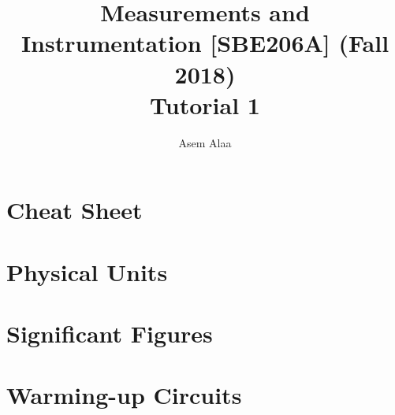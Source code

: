 \documentclass[a4paper,11pt]{book}
\begin{document}
\author{Asem Alaa}

\title{Measurements and Instrumentation [SBE206A] (Fall 2018)\\ Tutorial 1}

\maketitle

\chapter*{Cheat Sheet}


\chapter*{Physical Units}



\chapter*{Significant Figures}


\chapter*{Warming-up Circuits}
\end{document}
